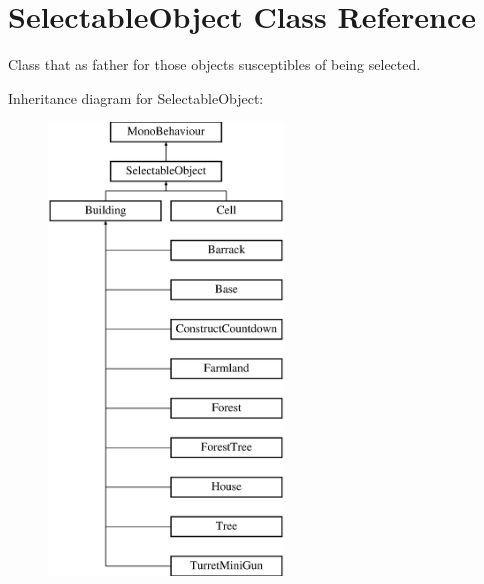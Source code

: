 \hypertarget{class_selectable_object}{}\section{Selectable\+Object Class Reference}
\label{class_selectable_object}


Class that as father for those objects susceptibles of being selected.  


Inheritance diagram for Selectable\+Object\+:\begin{figure}[H]
\begin{center}
\leavevmode
\includegraphics[height=12.000000cm]{class_selectable_object}
\end{center}
\end{figure}
